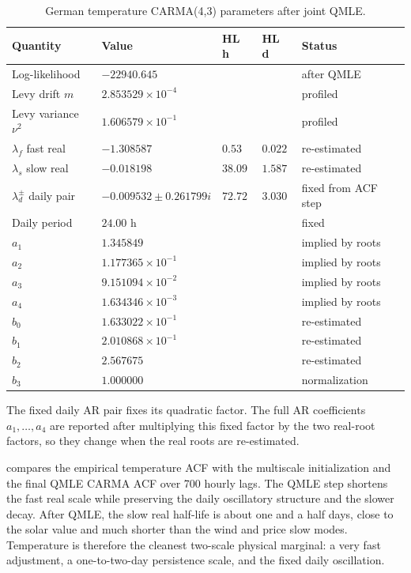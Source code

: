 \begin{table}[!htbp]
  \centering
  \caption{German temperature CARMA(4,3) parameters after joint QMLE.}
  \label{tab:temperature-carma-after-qmle}
  \begin{tabular}{@{}lllll@{}}
    \toprule
    Quantity & Value & HL h & HL d & Status \\
    \midrule
    Log-likelihood & \(-22940.645\) & & & after QMLE \\
    Levy drift \(m\) & \(2.853529{\times}10^{-4}\) & & & profiled \\
    Levy variance \(\nu^2\) & \(1.606579{\times}10^{-1}\) & & & profiled \\
    \midrule
    \(\lambda_f\) fast real & \(-1.308587\) & \(0.53\) & \(0.022\) & re-estimated \\
    \(\lambda_s\) slow real & \(-0.018198\) & \(38.09\) & \(1.587\) & re-estimated \\
    \(\lambda_d^\pm\) daily pair & \(-0.009532\pm0.261799i\) & \(72.72\) & \(3.030\) & fixed from ACF step \\
    Daily period & \(24.00\) h & & & fixed \\
    \midrule
    \(a_1\) & \(1.345849\) & & & implied by roots \\
    \(a_2\) & \(1.177365{\times}10^{-1}\) & & & implied by roots \\
    \(a_3\) & \(9.151094{\times}10^{-2}\) & & & implied by roots \\
    \(a_4\) & \(1.634346{\times}10^{-3}\) & & & implied by roots \\
    \midrule
    \(b_0\) & \(1.633022{\times}10^{-1}\) & & & re-estimated \\
    \(b_1\) & \(2.010868{\times}10^{-1}\) & & & re-estimated \\
    \(b_2\) & \(2.567675\) & & & re-estimated \\
    \(b_3\) & \(1.000000\) & & & normalization \\
    \bottomrule
  \end{tabular}
\end{table}

\FloatBarrier

The fixed daily AR pair fixes its quadratic factor. The full AR coefficients
\(a_1,\ldots,a_4\) are reported after multiplying this fixed factor by the two
real-root factors, so they change when the real roots are re-estimated.

 compares the empirical temperature ACF
with the multiscale initialization and the final QMLE CARMA ACF over 700 hourly
lags. The QMLE step shortens the fast real scale while preserving the daily
oscillatory structure and the slower decay.
After QMLE, the slow real half-life is about one and a half days, close to the
solar value and much shorter than the wind and price slow modes. Temperature is
therefore the cleanest two-scale physical marginal: a very fast adjustment, a
one-to-two-day persistence scale, and the fixed daily oscillation.

